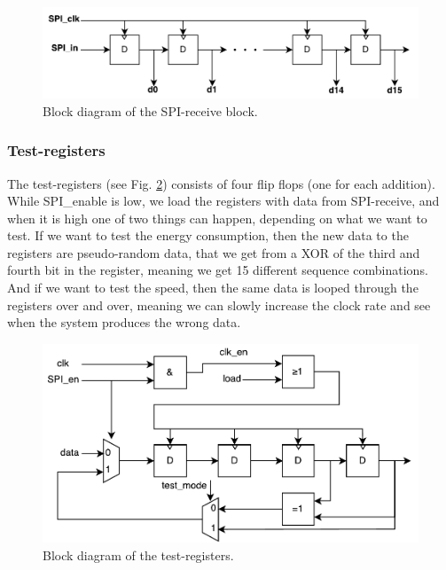 \begin{figure}[H]
	\centering
	\captionsetup{justification=centering}
	\includegraphics[scale=0.5]{../figures/SPI_receive.pdf}
	\caption{Block diagram of the SPI-receive block.} \label{fig:spi_receive}
\end{figure}

\subsubsection{Test-registers}
The test-registers (see Fig. \ref{fig:spi_prbs}) consists of four flip flops (one for each addition). While SPI\_enable is low, we load the registers with data from SPI-receive, and when it is high one of two things can happen, depending on what we want to test. If we want to test the energy consumption, then the new data to the registers are pseudo-random data, that we get from a XOR of the third and fourth bit in the register, meaning we get 15 different sequence combinations. And if we want to test the speed, then the same data is looped through the registers over and over, meaning we can slowly increase the clock rate and see when the system produces the wrong data.

\begin{figure}[H]
	\centering
	\captionsetup{justification=centering}
	\includegraphics[scale=0.5]{../figures/SPI_PRBS_2.pdf}
	\caption{Block diagram of the test-registers.} \label{fig:spi_prbs}
\end{figure}

